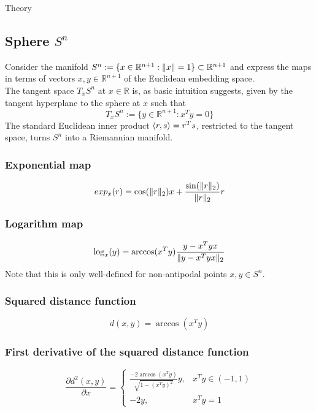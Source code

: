 \begin{chapter}{Theory}

\subsection{Sphere $S^n$} %
\label{sub:Sphere}
Consider the manifold $S^n:=\lbrace x\in\mathbb{R}^{n+1}: \| x \|=1\rbrace\subset\mathbb{R}^{n+1}$ and express the maps in terms of vectors $x,y\in\mathbb{R}^{n+1}$ of the Euclidean 
embedding space.\\
The tangent space $T_xS^n$ at $x\in\mathbb{R}$ is, as basic intuition suggests, given by the tangent hyperplane to the sphere at $x$ such that
\begin{equation}
    \label{eq:sntangentspace}
    T_xS^n:=\lbrace y\in\mathbb{R}^{n+1}: x^Ty=0 \rbrace
\end{equation}
The standard Euclidean inner product $\left\langle r,s \right\rangle=r^Ts$, restricted to the tangent space, turns $S^n$ into a Riemannian manifold.

\subsubsection{Exponential map} %
\label{ssub:ExponentialS2}
\begin{equation}
    exp_x(r)= \cos(\| r \|_2)x + \frac{\sin(\| r \|_{2})}{\| r \|_{2}}r 
\end{equation}

\subsubsection{Logarithm map} %
\label{ssub:LogarithmS2}
\begin{equation}
    \log_x(y)= \arccos(x^Ty)\frac{y-x^Tyx}{\| y-x^Tyx \|_2}
\end{equation}
Note that this is only well-defined for non-antipodal points $x,y\in S^n$.

\subsubsection{Squared distance function} %
\label{ssub:SquareddistanceS2}
\begin{equation}
    d(x,y)=\arccos(x^Ty)
\end{equation}

\subsubsection{First derivative of the squared distance function} %
\label{ssub:FirstDerS2}
\begin{equation}
    \frac{\partial d^2(x,y)}{\partial x}=\begin{cases}
	\frac{-2\arccos(x^Ty)}{\sqrt{1-(x^Ty)^{2}}}y, & x^Ty\in (-1,1)\\
	-2y, & x^Ty=1
    \end{cases}
\end{equation}


\end{chapter}
